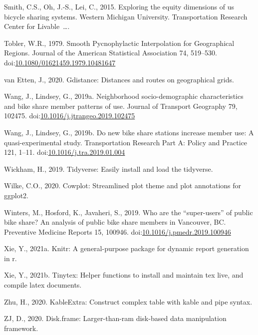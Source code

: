 \documentclass[]{elsarticle} %
\begin{document}
\leavevmode\hypertarget{ref-smith2015exploring}{}%
Smith, C.S., Oh, J.-S., Lei, C., 2015. Exploring the equity dimensions
of us bicycle sharing systems. Western Michigan University.
Transportation Research Center for Livable~\ldots.

\leavevmode\hypertarget{ref-toblerSmoothPycnophylacticInterpolation1979}{}%
Tobler, W.R., 1979. Smooth Pycnophylactic Interpolation for Geographical
Regions. Journal of the American Statistical Association 74, 519--530.
doi:\href{https://doi.org/10.1080/01621459.1979.10481647}{10.1080/01621459.1979.10481647}

\leavevmode\hypertarget{ref-R-gdistance}{}%
van Etten, J., 2020. Gdistance: Distances and routes on geographical
grids.

\leavevmode\hypertarget{ref-wangNeighborhoodSociodemographicCharacteristics2019}{}%
Wang, J., Lindsey, G., 2019a. Neighborhood socio-demographic
characteristics and bike share member patterns of use. Journal of
Transport Geography 79, 102475.
doi:\href{https://doi.org/10.1016/j.jtrangeo.2019.102475}{10.1016/j.jtrangeo.2019.102475}

\leavevmode\hypertarget{ref-wangNewBikeShare2019}{}%
Wang, J., Lindsey, G., 2019b. Do new bike share stations increase member
use: A quasi-experimental study. Transportation Research Part A: Policy
and Practice 121, 1--11.
doi:\href{https://doi.org/10.1016/j.tra.2019.01.004}{10.1016/j.tra.2019.01.004}

\leavevmode\hypertarget{ref-R-tidyverse}{}%
Wickham, H., 2019. Tidyverse: Easily install and load the tidyverse.

\leavevmode\hypertarget{ref-R-cowplot}{}%
Wilke, C.O., 2020. Cowplot: Streamlined plot theme and plot annotations
for ggplot2.

\leavevmode\hypertarget{ref-wintersWhoAreSuperusers2019}{}%
Winters, M., Hosford, K., Javaheri, S., 2019. Who are the
``super-users'' of public bike share? An analysis of public bike share
members in Vancouver, BC. Preventive Medicine Reports 15, 100946.
doi:\href{https://doi.org/10.1016/j.pmedr.2019.100946}{10.1016/j.pmedr.2019.100946}

\leavevmode\hypertarget{ref-R-knitr}{}%
Xie, Y., 2021a. Knitr: A general-purpose package for dynamic report
generation in r.

\leavevmode\hypertarget{ref-R-tinytex}{}%
Xie, Y., 2021b. Tinytex: Helper functions to install and maintain tex
live, and compile latex documents.

\leavevmode\hypertarget{ref-R-kableExtra}{}%
Zhu, H., 2020. KableExtra: Construct complex table with kable and pipe
syntax.

\leavevmode\hypertarget{ref-R-disk.frame}{}%
ZJ, D., 2020. Disk.frame: Larger-than-ram disk-based data manipulation
framework.
\end{document}
